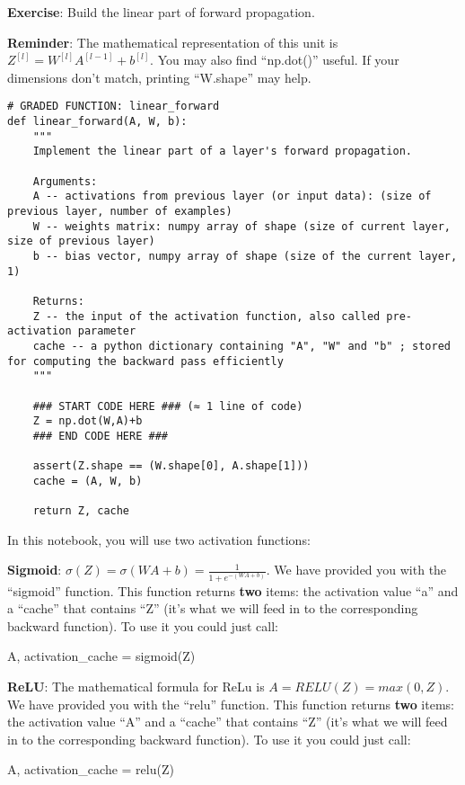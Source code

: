 {\textbf {Exercise}}: Build the linear part of forward propagation.

{\textbf {Reminder}:
The mathematical representation of this unit is $Z^{[l]} = W^{[l]}A^{[l-1]} +b^{[l]}$. You may also find ``np.dot()'' useful. If your dimensions don't match, printing ``W.shape'' may help.

\begin{verbatim}
# GRADED FUNCTION: linear_forward
def linear_forward(A, W, b):
    """
    Implement the linear part of a layer's forward propagation.

    Arguments:
    A -- activations from previous layer (or input data): (size of previous layer, number of examples)
    W -- weights matrix: numpy array of shape (size of current layer, size of previous layer)
    b -- bias vector, numpy array of shape (size of the current layer, 1)

    Returns:
    Z -- the input of the activation function, also called pre-activation parameter 
    cache -- a python dictionary containing "A", "W" and "b" ; stored for computing the backward pass efficiently
    """
    
    ### START CODE HERE ### (≈ 1 line of code)
    Z = np.dot(W,A)+b
    ### END CODE HERE ###
    
    assert(Z.shape == (W.shape[0], A.shape[1]))
    cache = (A, W, b)
    
    return Z, cache
\end{verbatim}    
    


In this notebook, you will use two activation functions:

{\textbf {Sigmoid}}: $\sigma(Z) = \sigma(W A + b) = \frac{1}{ 1 + e^{-(W A + b)}}$. We have provided you with the ``sigmoid'' function. This function returns {\textbf {two}} items: the activation value ``a'' and a ``cache'' that contains ``Z'' (it's what we will feed in to the corresponding backward function). To use it you could just call: 
\begin{mypython}  
A, activation_cache = sigmoid(Z)
\end{mypython}  

{\textbf {ReLU}}: The mathematical formula for ReLu is $A = RELU(Z) = max(0, Z)$. We have provided you with the ``relu'' function. This function returns {\textbf {two}} items: the activation value ``A'' and a ``cache'' that contains ``Z'' (it's what we will feed in to the corresponding backward function). To use it you could just call:
\begin{mypython}  
A, activation_cache = relu(Z)
\end{mypython}  
 
}
